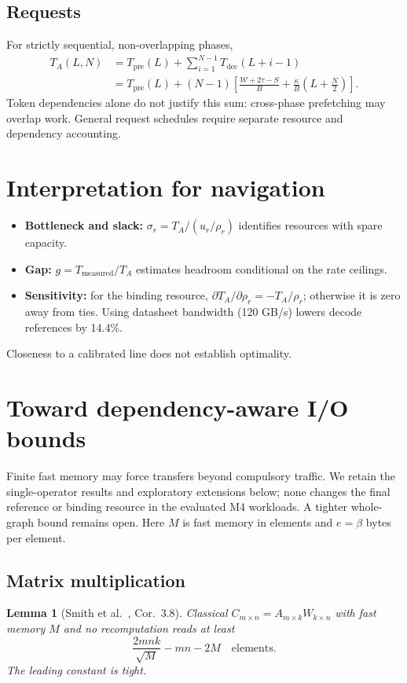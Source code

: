 \documentclass[11pt]{article}
\newtheorem{lemma}{Lemma}
\theoremstyle{definition}
\theoremstyle{remark}
\newcommand{\W}{\mathcal{W}}
\newcommand{\Tdec}{T_{\mathrm{dec}}}
\newcommand{\Tpre}{T_{\mathrm{pre}}}
\begin{document}
\subsection{Requests}
For strictly sequential, non-overlapping phases,
\begin{align}
T_A(L,N)&=\Tpre(L)+\sum_{i=1}^{N-1}\Tdec(L+i-1)\\
&=\Tpre(L)+(N-1)\left[\frac{\W+2\tau-S}{B}+\frac{\kappa}{B}\left(L+\frac{N}{2}\right)\right].
\end{align}
Token dependencies alone do not justify this sum: cross-phase prefetching may overlap work.
General request schedules require separate resource and dependency accounting.

\section{Interpretation for navigation}\label{sec:nav}
\begin{itemize}[nosep]
\item \textbf{Bottleneck and slack:} $\sigma_r=T_A/(u_r/\rho_r)$ identifies resources with spare capacity.
\item \textbf{Gap:} $g=T_{\mathrm{measured}}/T_A$ estimates headroom conditional on the rate ceilings.
\item \textbf{Sensitivity:} for the binding resource, $\partial T_A/\partial\rho_r=-T_A/\rho_r$;
otherwise it is zero away from ties. Using datasheet bandwidth (120 GB/s) lowers decode references by 14.4\%.
\end{itemize}
Closeness to a calibrated line does not establish optimality.

\section{Toward dependency-aware I/O bounds}\label{sec:io}
Finite fast memory may force transfers beyond compulsory traffic. We retain the single-operator
results and exploratory extensions below; none changes the final reference or binding resource in
the evaluated M4 workloads. A tighter whole-graph bound remains open.
Here $M$ is fast memory in elements and $e=\beta$ bytes per element.

\subsection{Matrix multiplication}
\begin{lemma}[Smith et al.~\cite{smith}, Cor.~3.8]\label{lem:gemm}
Classical $C_{m\times n}=A_{m\times k}W_{k\times n}$ with fast memory $M$ and no recomputation reads at least
\begin{equation}
\frac{2mnk}{\sqrt{M}}-mn-2M\quad\text{elements.}
\end{equation}
The leading constant is tight.
\end{lemma}
\end{document}
